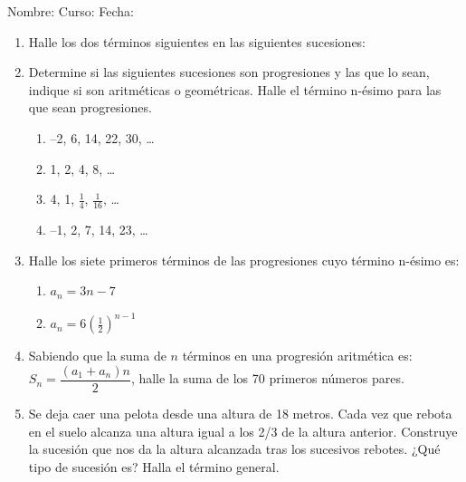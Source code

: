 \documentclass[fleqn]{article}
\newcommand{\LineaNombre}{%
\par
\vspace{\baselineskip}
Nombre:\hrulefill \; Curso: \underline{\hspace*{48pt}} \; Fecha: \underline{\hspace*{2.5cm}} \relax
\par}
\begin{document}
\LineaNombre
\begin{enumerate}
 \item Halle los dos términos siguientes en las siguientes sucesiones:
 \begin{enumerate}
 \end{enumerate}
 \item Determine si las siguientes sucesiones son progresiones y las que lo sean, indique si son aritméticas o geométricas. Halle el término n-ésimo para las que sean progresiones.
 \begin{enumerate}
 \item --2, 6, 14, 22, 30, \ldots \noanswer
 \item 1, 2, 4, 8, \ldots \noanswer
 \item 4, 1, $\frac{1}{4}$, $\frac{1}{16}$, \ldots \noanswer
 \item --1, 2, 7, 14, 23, \ldots \noanswer
 \end{enumerate}
 \item Halle los siete primeros términos de las progresiones cuyo término n-ésimo es:
 \begin{enumerate}
 \item $a_{n}=3n-7$\noanswer[0.25in]
 \item $a_{n}=6(\frac{1}{2})^{n-1}$ \noanswer[0.25in]
 \end{enumerate}
 \newpage
 \item Sabiendo que la suma de $n$ términos en una progresión aritmética es: $S_{n}=\dfrac{(a_{1}+a_{n})n}{2}$, halle la suma de los 70 primeros números pares.\noanswer
 \item Se deja caer una pelota desde una altura de 18 metros. Cada vez que rebota en el suelo alcanza una altura igual a los 2/3 de la altura anterior. Construye la sucesión que nos da la altura alcanzada tras los sucesivos rebotes. ¿Qué tipo de sucesión es? Halla el término general.\noanswer
 \end{enumerate}
\end{document}
